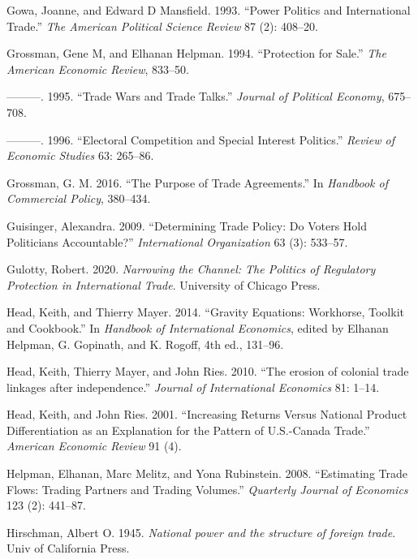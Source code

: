 \documentclass{puthesis}
\newlength{\cslhangindent}
\newenvironment{cslreferences}%
  {\setlength{\parindent}{0pt}%
  \everypar{\setlength{\hangindent}{\cslhangindent}}\ignorespaces}%
  {\par}
\begin{document}
\begin{cslreferences}
\leavevmode\hypertarget{ref-Gowa1993}{}%
Gowa, Joanne, and Edward D Mansfield. 1993. ``Power Politics and
International Trade.'' \emph{The American Political Science Review} 87
(2): 408--20.

\leavevmode\hypertarget{ref-Grossman1994}{}%
Grossman, Gene M, and Elhanan Helpman. 1994. ``Protection for Sale.''
\emph{The American Economic Review}, 833--50.

\leavevmode\hypertarget{ref-Grossman1995}{}%
---------. 1995. ``Trade Wars and Trade Talks.'' \emph{Journal of
Political Economy}, 675--708.

\leavevmode\hypertarget{ref-Grossman1996}{}%
---------. 1996. ``Electoral Competition and Special Interest
Politics.'' \emph{Review of Economic Studies} 63: 265--86.

\leavevmode\hypertarget{ref-Grossman2016}{}%
Grossman, G. M. 2016. ``The Purpose of Trade Agreements.'' In
\emph{Handbook of Commercial Policy}, 380--434.

\leavevmode\hypertarget{ref-Guisinger2009}{}%
Guisinger, Alexandra. 2009. ``Determining Trade Policy: Do Voters Hold
Politicians Accountable?'' \emph{International Organization} 63 (3):
533--57.

\leavevmode\hypertarget{ref-Gulotty2020}{}%
Gulotty, Robert. 2020. \emph{Narrowing the Channel: The Politics of
Regulatory Protection in International Trade}. University of Chicago
Press.

\leavevmode\hypertarget{ref-Head2014}{}%
Head, Keith, and Thierry Mayer. 2014. ``Gravity Equations: Workhorse,
Toolkit and Cookbook.'' In \emph{Handbook of International Economics},
edited by Elhanan Helpman, G. Gopinath, and K. Rogoff, 4th ed., 131--96.

\leavevmode\hypertarget{ref-Head2010}{}%
Head, Keith, Thierry Mayer, and John Ries. 2010. ``The erosion of
colonial trade linkages after independence.'' \emph{Journal of
International Economics} 81: 1--14.

\leavevmode\hypertarget{ref-Head2001}{}%
Head, Keith, and John Ries. 2001. ``Increasing Returns Versus National
Product Differentiation as an Explanation for the Pattern of U.S.-Canada
Trade.'' \emph{American Economic Review} 91 (4).

\leavevmode\hypertarget{ref-Helpman2008}{}%
Helpman, Elhanan, Marc Melitz, and Yona Rubinstein. 2008. ``Estimating
Trade Flows: Trading Partners and Trading Volumes.'' \emph{Quarterly
Journal of Economics} 123 (2): 441--87.

\leavevmode\hypertarget{ref-Hirschman1945}{}%
Hirschman, Albert O. 1945. \emph{National power and the structure of
foreign trade}. Univ of California Press.


\end{cslreferences}
\end{document}
